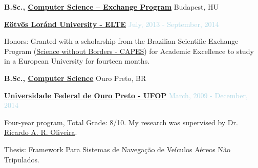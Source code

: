 \medskip

\textbf{B.Sc., 
        \href{https://www.elte.hu}
             {Computer Science -- Exchange Program}} \hfill Budapest, HU

\begin{outerlist}

\item[] \href{https://www.elte.hu}{\textbf{Eötvös Loránd University - ELTE}} \hfill {\textcolor{lightblue}{July, 2013 - September, 2014}} \medskip
        \begin{innerlist}[-]
        \item Honors: Granted with a scholarship from the Brazilian Scientific Exchange Program (\href{http://capes.gov.br/images/stories/download/diversos/folder-SWB.pdf}{Science without Borders - CAPES}) for Academic Excellence to study in a European University for fourteen months.
        \end{innerlist}

\end{outerlist}

\textbf{B.Sc., 
        \href{https://ufop.br}
             {Computer Science}} \hfill Ouro Preto, BR

\begin{outerlist}

\item[] \href{https://ufop.br}{\textbf{Universidade Federal de Ouro Preto - UFOP}} \hfill {\textcolor{lightblue}{March, 2009 - December, 2014}} \medskip
        \begin{innerlist}[-]
        \item Four-year program, Total Grade: 8/10. My research was supervised by \href{http://buscatextual.cnpq.br/buscatextual/visualizacv.do?id=K4701865J6}{Dr. Ricardo A. R. Oliveira}.
        \item Thesis: Framework Para Sistemas de Navegação de Veículos Aéreos Não Tripulados.
        \end{innerlist}

\end{outerlist}


